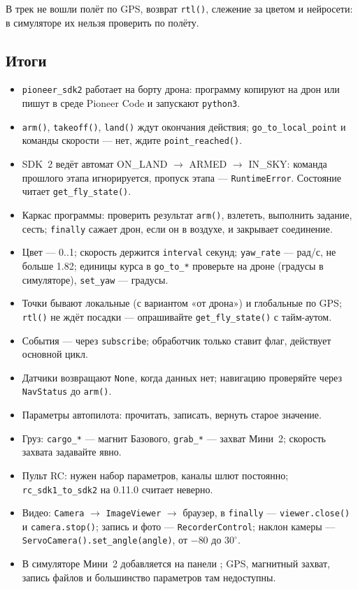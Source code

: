 В трек не вошли полёт по GPS, возврат \verb|rtl()|, слежение за цветом и нейросети: в симуляторе их нельзя проверить по полёту.

\subsection*{Итоги}
\begin{itemize}
    \item \texttt{pioneer\_sdk2} работает на борту дрона: программу копируют на дрон или пишут в среде Pioneer Code и запускают \verb|python3|.
    \item \verb|arm()|, \verb|takeoff()|, \verb|land()| ждут окончания действия; \verb|go_to_local_point| и команды скорости --- нет, ждите \verb|point_reached()|.
    \item SDK~2 ведёт автомат ON\_LAND $\to$ ARMED $\to$ IN\_SKY: команда прошлого этапа игнорируется, пропуск этапа --- \verb|RuntimeError|. Состояние читает \verb|get_fly_state()|.
    \item Каркас программы: проверить результат \verb|arm()|, взлететь, выполнить задание, сесть; \verb|finally| сажает дрон, если он в воздухе, и закрывает соединение.
    \item Цвет --- 0..1; скорость держится \verb|interval| секунд; \verb|yaw_rate| --- рад/с, не больше 1.82; единицы курса в \verb|go_to_*| проверьте на дроне (градусы в симуляторе), \verb|set_yaw| --- градусы.
    \item Точки бывают локальные (с вариантом «от дрона») и глобальные по GPS; \verb|rtl()| не ждёт посадки --- опрашивайте \verb|get_fly_state()| с тайм-аутом.
    \item События --- через \verb|subscribe|; обработчик только ставит флаг, действует основной цикл.
    \item Датчики возвращают \verb|None|, когда данных нет; навигацию проверяйте через \verb|NavStatus| до \verb|arm()|.
    \item Параметры автопилота: прочитать, записать, вернуть старое значение.
    \item Груз: \verb|cargo_*| --- магнит Базового, \verb|grab_*| --- захват Мини~2; скорость захвата задавайте явно.
    \item Пульт RC: нужен набор параметров, каналы шлют постоянно; \verb|rc_sdk1_to_sdk2| на 0.11.0 считает неверно.
    \item Видео: \verb|Camera| $\to$ \verb|ImageViewer| $\to$ браузер, в \verb|finally| --- \verb|viewer.close()| и \verb|camera.stop()|; запись и фото --- \verb|RecorderControl|; наклон камеры --- \verb|ServoCamera().set_angle(angle)|, от $-80$ до $30^\circ$.
    \item В симуляторе Мини~2 добавляется на панели ; GPS, магнитный захват, запись файлов и большинство параметров там недоступны.
\end{itemize}
